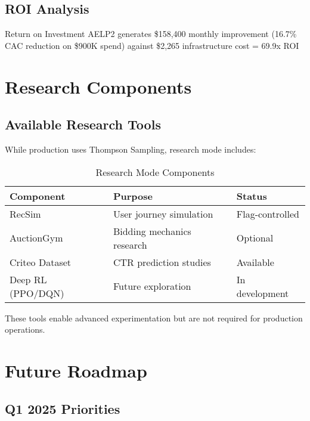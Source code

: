 \documentclass[11pt,a4paper]{report}
\begin{document}
\section{ROI Analysis}

\begin{insightbox}{Return on Investment}
AELP2 generates \$158,400 monthly improvement (16.7\% CAC reduction on \$900K spend) against \$2,265 infrastructure cost = 69.9x ROI
\end{insightbox}

\clearpage

\chapter{Research Components}

\section{Available Research Tools}

While production uses Thompson Sampling, research mode includes:

\begin{table}[H]
\centering
\begin{tabular}{|l|l|l|}
\hline
\rowcolor{aelpgray!20}
\textbf{Component} & \textbf{Purpose} & \textbf{Status} \\
\hline
RecSim & User journey simulation & Flag-controlled \\
AuctionGym & Bidding mechanics research & Optional \\
Criteo Dataset & CTR prediction studies & Available \\
Deep RL (PPO/DQN) & Future exploration & In development \\
\hline
\end{tabular}
\caption{Research Mode Components}
\end{table}

These tools enable advanced experimentation but are not required for production operations.

\clearpage

\chapter{Future Roadmap}

\section{Q1 2025 Priorities}
\end{document}
